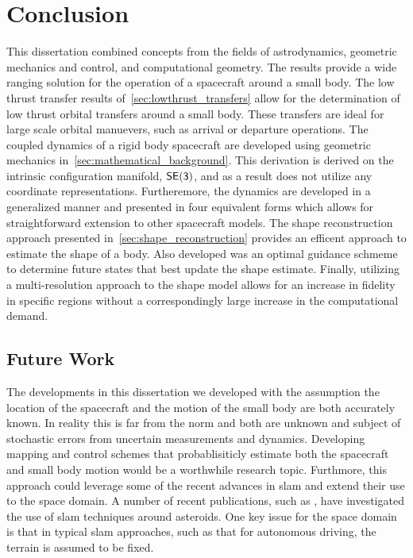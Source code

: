 
\chapter{Conclusion}\label{sec:conclusion}

This dissertation combined concepts from the fields of astrodynamics, geometric mechanics and control, and computational geometry.
The results provide a wide ranging solution for the operation of a spacecraft around a small body.
The low thrust transfer results of~\cref{sec:lowthrust_transfers} allow for the determination of low thrust orbital transfers around a small body. 
These transfers are ideal for large scale orbital manuevers, such as arrival or departure operations.
The coupled dynamics of a rigid body spacecraft are developed using geometric mechanics in~\cref{sec:mathematical_background}.
This derivation is derived on the intrinsic configuration manifold, \( \mathsf{SE(3)} \), and as a result does not utilize any coordinate representations.
Furtheremore, the dynamics are developed in a generalized manner and presented in four equivalent forms which allows for straightforward extension to other spacecraft models.
The shape reconstruction approach presented in~\cref{sec:shape_reconstruction} provides an efficent approach to estimate the shape of a body. 
Also developed was an optimal guidance schmeme to determine future states that best update the shape estimate. 
Finally, utilizing a multi-resolution approach to the shape model allows for an increase in fidelity in specific regions without a correspondingly large increase in the computational demand.

\section{Future Work}

The developments in this dissertation we developed with the assumption the location of the spacecraft and the motion of the small body are both accurately known.
In reality this is far from the norm and both are unknown and subject of stochastic errors from uncertain measurements and dynamics. 
Developing mapping and control schemes that probablisiticly estimate both the spacecraft and small body motion would be a worthwhile research topic.
Furthmore, this approach could leverage some of the recent advances in \gls{slam} and extend their use to the space domain.
A number of recent publications, such as \textcite{cocaud2010,cocaud2012,vassallo2015,kulumani2017b}, have investigated the use of \gls{slam} techniques around asteroids.
One key issue for the space domain is that in typical \gls{slam} approaches, such as that for autonomous driving, the terrain is assumed to be fixed.

